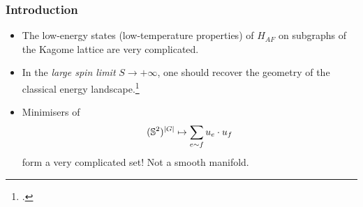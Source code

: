 \documentclass[mathserif]{beamer}
\begin{document}
\begin{frame}
\begin{center}
\begin{picture}
        \end{picture}
      \end{center}

    \end{frame}

    \begin{frame}
      \frametitle{Introduction}
      \begin{itemize}
      \item The low-energy states (low-temperature properties) of
        $H_{AF}$ on subgraphs of the Kagome lattice are very
        complicated.
      \item<2-> In the \emph{large spin limit} $S\to +\infty$, one
        should recover the geometry of the classical energy landscape.\footcite{doucot_semiclassical_1998}
      \item<2-> Minimisers of
        \[
          (\S^2)^{|G|} \mapsto \sum_{e\sim f}u_e\cdot u_f
        \]
        form a very complicated set! Not a smooth manifold.
      \end{itemize}
    \end{frame}
\end{document}
